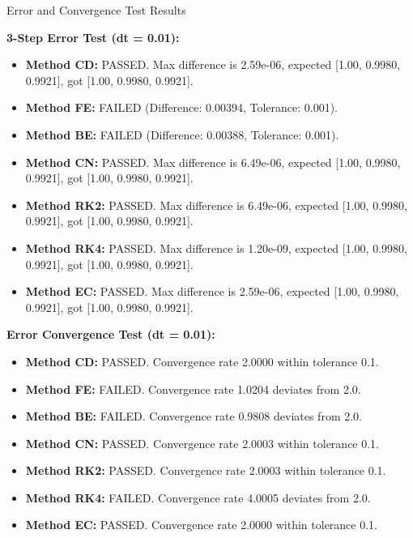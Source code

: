 \documentclass[10pt, aspectratio=54]{beamer}
\begin{document}
\begin{frame}[fragile]{Error and Convergence Test Results}
	\scriptsize %
	
	\textbf{3-Step Error Test (dt = 0.01):}
	\begin{itemize}
		\item \textbf{Method CD:} PASSED. Max difference is 2.59e-06, expected [1.00, 0.9980, 0.9921], got [1.00, 0.9980, 0.9921].
		\item \textbf{Method FE:} FAILED (Difference: 0.00394, Tolerance: 0.001).
		\item \textbf{Method BE:} FAILED (Difference: 0.00388, Tolerance: 0.001).
		\item \textbf{Method CN:} PASSED. Max difference is 6.49e-06, expected [1.00, 0.9980, 0.9921], got [1.00, 0.9980, 0.9921].
		\item \textbf{Method RK2:} PASSED. Max difference is 6.49e-06, expected [1.00, 0.9980, 0.9921], got [1.00, 0.9980, 0.9921].
		\item \textbf{Method RK4:} PASSED. Max difference is 1.20e-09, expected [1.00, 0.9980, 0.9921], got [1.00, 0.9980, 0.9921].
		\item \textbf{Method EC:} PASSED. Max difference is 2.59e-06, expected [1.00, 0.9980, 0.9921], got [1.00, 0.9980, 0.9921].
	\end{itemize}
	
	\textbf{Error Convergence Test (dt = 0.01):}
	\begin{itemize}
		\item \textbf{Method CD:} PASSED. Convergence rate 2.0000 within tolerance 0.1.
		\item \textbf{Method FE:} FAILED. Convergence rate 1.0204 deviates from 2.0.
		\item \textbf{Method BE:} FAILED. Convergence rate 0.9808 deviates from 2.0.
		\item \textbf{Method CN:} PASSED. Convergence rate 2.0003 within tolerance 0.1.
		\item \textbf{Method RK2:} PASSED. Convergence rate 2.0003 within tolerance 0.1.
		\item \textbf{Method RK4:} FAILED. Convergence rate 4.0005 deviates from 2.0.
		\item \textbf{Method EC:} PASSED. Convergence rate 2.0000 within tolerance 0.1.
	\end{itemize}
	

\end{frame}
\end{document}

